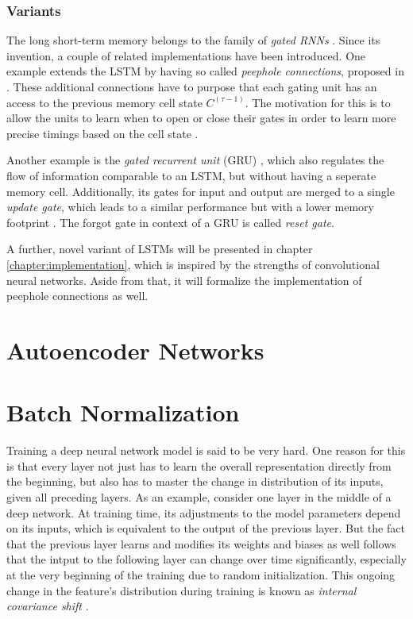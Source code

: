 \subsubsection{Variants}

The long short-term memory belongs to the family of \textit{gated RNNs} \parencite[p. 411]{deep_learning}. Since its invention, a couple of related implementations have been introduced. One example extends the LSTM by having so called \textit{peephole connections}, proposed in \parencite{lstm_peep}. These additional connections have to purpose that each gating unit has an access to the previous memory cell state $ C^{(\tau-1)} $. The motivation for this is to allow the units to learn when to open or close their gates in order to learn more precise timings based on the cell state \parencite{lstm-space}.

Another example is the \textit{gated recurrent unit} (GRU) \parencite{gru}, which also regulates the flow of information comparable to an LSTM, but without having a seperate memory cell. Additionally, its gates for input and output are merged to a single \textit{update gate}, which leads to a similar performance but with a lower memory footprint \parencite{gru-video}. The forgot gate in context of a GRU is called \textit{reset gate}.

A further, novel variant of LSTMs will be presented in chapter \ref{chapter:implementation}, which is inspired by the strengths of convolutional neural networks. Aside from that, it will formalize the implementation of peephole connections as well.



\section{Autoencoder Networks} \label{sec:autoencoder}



\section{Batch Normalization}

Training a deep neural network model is said to be very hard. One reason for this is that every layer not just has to learn the overall representation directly from the beginning, but also has to master the change in distribution of its inputs, given all preceding layers. As an example, consider one layer in the middle of a deep network. At training time, its adjustments to the model parameters depend on its inputs, which is equivalent to the output of the previous layer. But the fact that the previous layer learns and modifies its weights and biases as well follows that the intput to the following layer can change over time significantly, especially at the very beginning of the training due to random initialization. This ongoing change in the feature's distribution during training is known as \textit{internal covariance shift} \parencite{rnn-batchnorm}.

